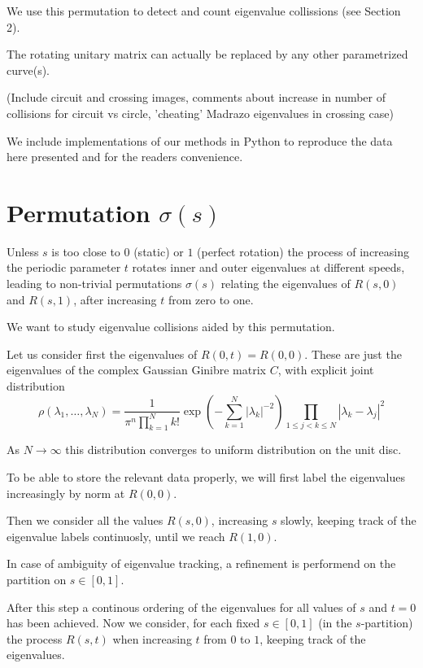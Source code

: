 \documentclass{article}
\begin{document}
	We use this permutation to detect and count eigenvalue collissions (see Section 2).

	The rotating unitary matrix can actually be replaced by any other parametrized curve(s).

	(Include circuit and crossing images, 
	comments about increase in number of collisions for circuit vs circle, 
	'cheating' Madrazo eigenvalues in crossing case)

	We include implementations of our methods in Python 
	to reproduce the data here presented 
	and for the readers convenience.

	\newpage
	\section{Permutation $\sigma(s)$}

	Unless $s$ is too close to $0$ (static) or $1$ (perfect rotation) 
	the process of increasing the periodic parameter $t$
	rotates inner and outer eigenvalues at different speeds, leading to 
	non-trivial permutations $\sigma(s)$ relating the eigenvalues of $R(s,0)$ and $R(s,1)$, 
	after increasing $t$ from zero to one.

	We want to study eigenvalue collisions aided by this permutation.

	Let us consider first the eigenvalues of $R(0,t) = R(0,0)$. 
	These are just the eigenvalues of the complex Gaussian Ginibre matrix $C$,
	with explicit joint distribution 
	$$\rho (\lambda_1, \dots , \lambda_N) = 
	\frac{1}{\pi^n \prod_{k=1}^N k!}
	\exp(-\sum_{k=1}^N |\lambda_{k}|^{-2}) 
	\prod_{1\leq j < k \leq N} |\lambda_k - \lambda_j|^2$$

	As $N\to \infty$ this distribution converges to uniform distribution on the unit disc.

	To be able to store the relevant data properly, 
	we will first label the eigenvalues increasingly by norm at $R(0,0)$. 
	
	Then we consider all the values $R(s,0)$, 
	increasing $s$ slowly, keeping track of the eigenvalue labels continuosly, 
	until we reach $R(1,0)$. 
	
	In case of ambiguity of eigenvalue tracking, a refinement is performend on 
	the partition on $s \in [0,1]$.

	After this step a continous ordering of the eigenvalues for all values 
	of $s$ and $t=0$ has been achieved. Now we consider, for each fixed $s\in [0,1]$ 
	(in the $s$-partition) the process $R(s,t)$ when increasing $t$ from $0$ to $1$, 
	keeping track of the eigenvalues.
\end{document}
